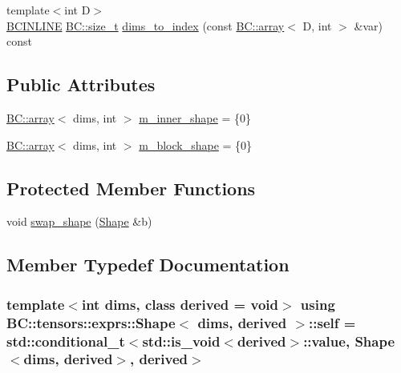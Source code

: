 \begin{DoxyCompactItemize}
\item 
{\footnotesize template$<$int D$>$ }\\\hyperlink{BlackCat__Common_8h_a6699e8b0449da5c0fafb878e59c1d4b1}{B\+C\+I\+N\+L\+I\+NE} \hyperlink{namespaceBC_a6007cbc4eeec401a037b558910a56173}{B\+C\+::size\+\_\+t} \hyperlink{classBC_1_1tensors_1_1exprs_1_1Shape_a4970c464bbe2edc4332936cbf8c38c61}{dims\+\_\+to\+\_\+index} (const \hyperlink{structBC_1_1array}{B\+C\+::array}$<$ D, int $>$ \&var) const 
\end{DoxyCompactItemize}
\subsection*{Public Attributes}
\begin{DoxyCompactItemize}
\item 
\hyperlink{structBC_1_1array}{B\+C\+::array}$<$ dims, int $>$ \hyperlink{classBC_1_1tensors_1_1exprs_1_1Shape_af933efdf7c81e6748501c2538e74ca1c}{m\+\_\+inner\+\_\+shape} = \{0\}
\item 
\hyperlink{structBC_1_1array}{B\+C\+::array}$<$ dims, int $>$ \hyperlink{classBC_1_1tensors_1_1exprs_1_1Shape_a5d6bf18f1697eb2b35da06d87ad6e333}{m\+\_\+block\+\_\+shape} = \{0\}
\end{DoxyCompactItemize}
\subsection*{Protected Member Functions}
\begin{DoxyCompactItemize}
\item 
void \hyperlink{classBC_1_1tensors_1_1exprs_1_1Shape_ae25a7ce9f13083ff220fa6b7b0ee73f4}{swap\+\_\+shape} (\hyperlink{classBC_1_1tensors_1_1exprs_1_1Shape}{Shape} \&b)
\end{DoxyCompactItemize}


\subsection{Member Typedef Documentation}
\subsubsection[{\texorpdfstring{self}{self}}]{\setlength{\rightskip}{0pt plus 5cm}template$<$int dims, class derived = void$>$ using {\bf B\+C\+::tensors\+::exprs\+::\+Shape}$<$ dims, derived $>$\+::{\bf self} =  std\+::conditional\+\_\+t$<$std\+::is\+\_\+void$<$derived$>$\+::value, {\bf Shape}$<$dims, derived$>$, derived$>$}\hypertarget{classBC_1_1tensors_1_1exprs_1_1Shape_ab3bf59646b50856337de082c3ef54ebd}{}\label{classBC_1_1tensors_1_1exprs_1_1Shape_ab3bf59646b50856337de082c3ef54ebd}


